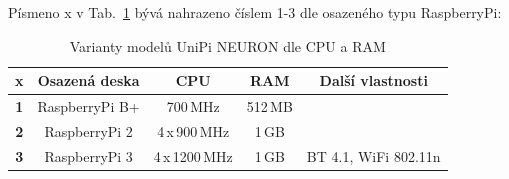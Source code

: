 \begin{table}[!ht]
\caption{Porovnání modelů UniPi NEURON dle I/O \cite{UniPiBoard2}}
\vspace{-20pt}
\label{TableUnipiIO}
	\begin{center}
	\end{center}
\end{table}

\newpage
Písmeno x v Tab.~\ref{TableUnipiVar} bývá nahrazeno číslem 1-3 dle osazeného typu RaspberryPi:

\begin{table}[!ht]
\caption{Varianty modelů UniPi NEURON dle CPU a RAM \cite{UniPiBoard2}}
\vspace{-10pt}
\label{TableUnipiVar}
	\begin{center}
\begin{tabular}{|c|c|c|c|c|}
\hline
x & \textbf{Osazená deska} & \textbf{CPU} & \textbf{RAM} & \textbf{Další vlastnosti} \\ \hline \hline
\textbf{1} & RaspberryPi B+ & 700\,MHz & 512\,MB &  \\ \hline
\textbf{2} & RaspberryPi 2 & 4\,x\,900\,MHz & 1\,GB &  \\ \hline
\textbf{3} & RaspberryPi 3 & 4\,x\,1200\,MHz & 1\,GB & BT 4.1, WiFi 802.11n \\ \hline \hline
\end{tabular}
	\end{center}
\end{table}

